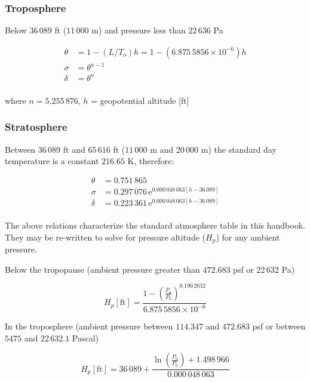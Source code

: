 \documentclass[
]{book}
\begin{document}
\hypertarget{troposphere}{%
\subsubsection*{Troposphere}\label{troposphere}}

Below \(36\,089\) ft (\(11\,000\) m) and pressure less than \(22\,636\) Pa

\begin{align}
\theta &= 1 − \left( L/Τ_ο \right) h = 1 - \left( 6.875\,5856 \times 10^{-6} \right) h \\
\sigma &= \theta^{n-1} \\
\delta &= \theta^n \\
\end{align}

where \(n = 5.255\,876\), \(h\) = geopotential altitude {[}ft{]}

\hypertarget{stratosphere}{%
\subsubsection*{Stratosphere}\label{stratosphere}}

Between \(36\,089\) ft and \(65\,616\) ft (\(11\,000\) m and \(20\,000\) m) the standard day temperature is a constant \(216.65\) K, therefore:

\begin{align}
\theta &= 0.751\,865 \\
\sigma &= 0.297\,076\, \mathrm{e}^{0.000\,048\,063 \left[ h - 36\,089 \right]} \\
\delta &= 0.223\,361\, \mathrm{e}^{0.000\,048\,063 \left[ h - 36\,089 \right]} \\
\end{align}

The above relations characterize the standard atmosphere table in this handbook.
They may be re-written to solve for pressure altitude (\(H_p\)) for any ambient pressure.

Below the tropopause (ambient pressure greater than \(472.683\) psf or \(22\,632\) Pa)

\[
H_p \left[ \text{ft} \right] = \frac{ 1-\left( \frac{P_a}{P_0} \right)^{0.190\,2632} }{6.875\,5856 \times 10^{-6}}
\]

In the troposphere (ambient pressure between \(114.347\) and \(472.683\) psf or between \(5475\) and \(22\,632.1\) Pascal)

\[
H_p \left[ \text{ft} \right] = 36\,089+ \frac{ \ln \left( \frac{P_a}{P_0} \right) + 1.498\,966 }{ 0.000\,048\,063 }
\]
\end{document}
